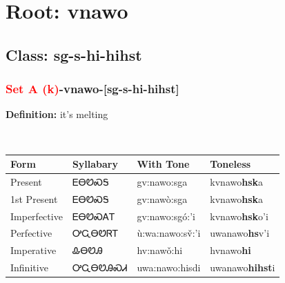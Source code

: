 \needspace{4in}
\section*{Root: vnawo}
\nopagebreak
{}
\needspace{3in}
\subsection*{Class: sg-s-hi-hihst}
\nopagebreak
\needspace{2in}
\subsubsection*{\textcolor{Red}{Set A (k)}{-}\textbf{vnawo}{-}[sg-s-hi-hihst]}
\nopagebreak
\textbf{Definition: } it{\textquoteright}s melting
\\[0.5em]
\begin{tabularx}{\textwidth}{l X X X}%
\toprule%
\textbf{Form}&\textbf{Syllabary}&\textbf{With Tone}&\textbf{Toneless}\\%
\midrule%
Present&ᎬᎾᏬᏍᎦ&gv:nawo:sga&kvnawo\textbf{hsk}a\\%
1st Present&ᎬᎾᏬᏍᎦ&gv:nawò:sga&kvnawo\textbf{hsk}a\\%
Imperfective&ᎬᎾᏬᏍᎪᎢ&gv:nawo:sgó:’i&kvnawo\textbf{hsk}o'i\\%
Perfective&ᎤᏩᎾᏬᏒᎢ&ù:wa:nawo:sv̌:’i&uwanawo\textbf{hs}v'i\\%
Imperative&ᎲᎾᏬᎯ&hv:nawǒ:hi&hvnawo\textbf{hi}\\%
Infinitive&ᎤᏩᎾᏬᎯᏍᏗ&uwa:nawo:hisdi&uwanawo\textbf{hihst}i\\%
\bottomrule%
\end{tabularx}
\\[1em]